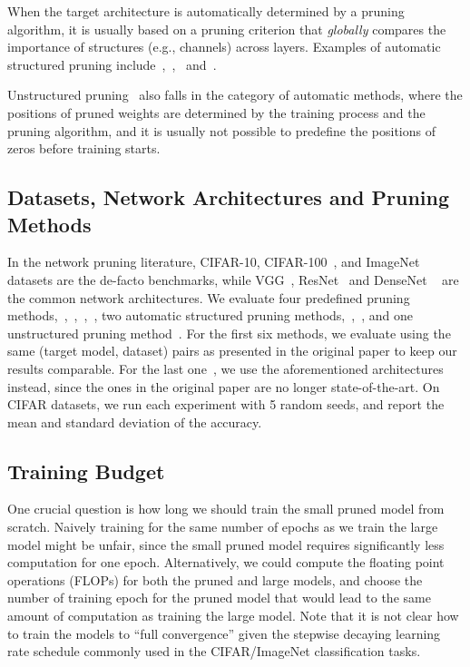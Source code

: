 When the target architecture is automatically determined by a pruning algorithm, it is usually based on a pruning criterion that \emph{globally} compares the importance of structures (e.g., channels) across layers. Examples of automatic structured pruning include~\cite{liu2017learning},~\cite{huang2018data},~\cite{nvidia} and~\cite{pfa}. 

Unstructured pruning~\cite{han2015learning, vdropout, l0sparse} also falls in the category of automatic methods, where the positions of pruned weights are determined by the training process and the pruning algorithm, and it is usually not possible to predefine the positions of zeros before training starts.

\subsection{Datasets, Network Architectures and Pruning Methods}
In the network pruning literature, CIFAR-10, CIFAR-100~\cite{cifar}, and ImageNet~\cite{imagenet} datasets are the de-facto benchmarks, while VGG~\cite{vgg}, ResNet~\cite{resnet} and DenseNet ~\cite{densenet} are the common network architectures. 
We evaluate four predefined pruning methods,~\cite{li2016pruning},~\cite{luo2017thinet},~\cite{he2017channel},~\cite{he2018sfp}, two automatic structured pruning methods,~\cite{liu2017learning},~\cite{ huang2018data}, and one unstructured pruning method~\cite{han2015learning}. For the first six methods, we evaluate using the same (target model, dataset) pairs as presented in the original paper to keep our results comparable. For the last one~\cite{han2015learning}, we use the aforementioned architectures instead, since the ones in the original paper are no longer state-of-the-art. On CIFAR datasets, we run each experiment with 5 random seeds, and report the mean and standard deviation of the accuracy. 

\subsection{Training Budget}
One crucial question is how long we should train the small pruned model from scratch. Naively training for the same number of epochs as we train the large model might be unfair, since the small pruned model requires significantly less computation for one epoch. Alternatively, we could compute the floating point operations (FLOPs) for both the pruned and large models, and choose the number of training epoch for the pruned model that would lead to the same amount of computation as training the large model. Note that it is not clear how to train the models to ``full convergence'' given the stepwise decaying learning rate schedule commonly used in the CIFAR/ImageNet classification tasks. 

